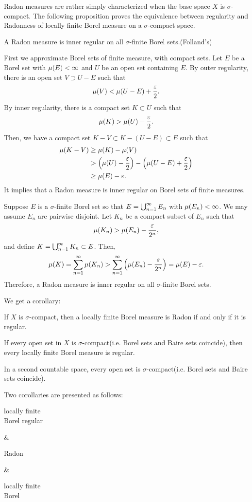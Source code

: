 \documentclass{../exp}
\begin{document}
Radon measures are rather simply characterized when the base space $X$ is $\sigma$-compact.
The following proposition proves the equivalence between regularity and Radonness of locally finite Borel measure on a $\sigma$-compact space.
\begin{prop}
A Radon measure is inner regular on all $\sigma$-finite Borel sets.(Folland's)
\end{prop}
\begin{pf}
First we approximate Borel sets of finite measure, with compact sets.
Let $E$ be a Borel set with $\mu(E)<\infty$ and $U$ be an open set containing $E$.
By outer regularity, there is an open set $V\supset U-E$ such that
\[\mu(V)<\mu(U-E)+\frac{\varepsilon}2.\]
By inner regularity, there is a compact set $K\subset U$ such that
\[\mu(K)>\mu(U)-\frac{\varepsilon}2.\]
Then, we have a compact set $K-V\subset K-(U-E)\subset E$ such that
\begin{align*}
\mu(K-V)&\ge\mu(K)-\mu(V)\\
&>\left(\mu(U)-\frac{\varepsilon}2\right)-\left(\mu(U-E)+\frac{\varepsilon}2\right)\\
&\ge\mu(E)-\varepsilon.
\end{align*}
It implies that a Radon measure is inner regular on Borel sets of finite measures.

Suppose $E$ is a $\sigma$-finite Borel set so that $E=\bigcup_{n=1}^\infty E_n$ with $\mu(E_n)<\infty$.
We may assume $E_n$ are pairwise disjoint.
Let $K_n$ be a compact subset of $E_n$ such that
\[\mu(K_n)>\mu(E_n)-\frac{\varepsilon}{2^n},\]
and define $K=\bigcup_{n=1}^\infty K_n\subset E$.
Then,
\[\mu(K)=\sum_{n=1}^\infty\mu(K_n)>\sum_{n=1}^\infty\left(\mu(E_n)-\frac{\varepsilon}{2^n}\right)=\mu(E)-\varepsilon.\]
Therefore, a Radon measure is inner regular on all $\sigma$-finite Borel sets.
\end{pf}
We get a corollary:
\begin{cor}
If $X$ is $\sigma$-compact, then a locally finite Borel measure is Radon if and only if it is regular.
\end{cor}

\begin{thm}
If every open set in $X$ is $\sigma$-compact(i.e. Borel sets and Baire sets coincide), then every locally finite Borel measure is regular.
\end{thm}
\begin{prop}
In a second countable space, every open set is $\sigma$-compact(i.e. Borel sets and Baire sets coincide).
\end{prop}


Two corollaries are presented as follows:
\begin{rd}[column sep={120pt,between origins}]
\parbox{7em}{\centering locally finite \\ Borel regular}  &
\parbox{5em}{\centering Radon}     &
\parbox{7em}{\centering locally finite \\ Borel}  
\end{rd}
\end{document}
